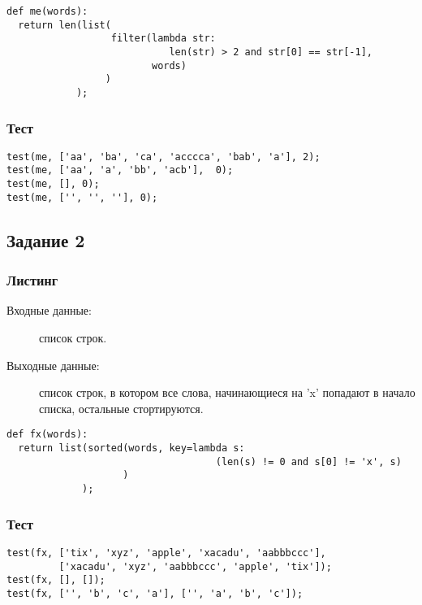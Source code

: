 \documentclass[12pt, a4paper] {ncc}
\begin{document}
        \lstset{language=Python}
        \begin{lstlisting}
def me(words):
  return len(list(
                  filter(lambda str:
                            len(str) > 2 and str[0] == str[-1],
                         words)
                 )
            );
        \end{lstlisting}

        \subsubsection{Тест}

        \begin{lstlisting}
test(me, ['aa', 'ba', 'ca', 'acccca', 'bab', 'a'], 2);
test(me, ['aa', 'a', 'bb', 'acb'],  0);
test(me, [], 0);
test(me, ['', '', ''], 0);
        \end{lstlisting}

    \subsection{Задание 2}

        \subsubsection{Листинг}
        \begin{description}
            \item[Входные данные:] список строк.
            \item[Выходные данные:] список строк, в котором все слова, начинающиеся на 'x'
                 попадают в начало списка, остальные стортируются. 
        \end{description}

        \begin{lstlisting}
def fx(words):
  return list(sorted(words, key=lambda s:
                                    (len(s) != 0 and s[0] != 'x', s)
                    )
             );
        \end{lstlisting}

        \subsubsection{Тест}

        \begin{lstlisting}
test(fx, ['tix', 'xyz', 'apple', 'xacadu', 'aabbbccc'],
         ['xacadu', 'xyz', 'aabbbccc', 'apple', 'tix']);
test(fx, [], []);
test(fx, ['', 'b', 'c', 'a'], ['', 'a', 'b', 'c']);
        \end{lstlisting}
\end{document}
